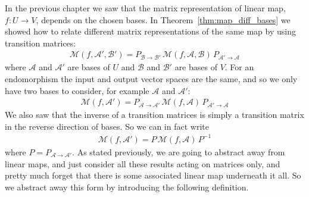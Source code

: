 In the previous chapter we saw that the matrix representation of linear map, $f:U\to V$, depends on the chosen bases. In Theorem~\ref{thm:map_diff_bases} we showed how to relate different matrix representations of the same map by using transition matrices:
\begin{align*}
\mathcal{M}(f,\mathcal{A}',\mathcal{B}') = P_{\mathcal{B}\to\mathcal{B}'} \, \mathcal{M}(f,\mathcal{A},\mathcal{B}) \, P_{\mathcal{A}'\to\mathcal{A}}
\end{align*}
where $\mathcal{A}$ and $\mathcal{A}'$ are bases of $U$ and $\mathcal{B}$ and $\mathcal{B}'$ are bases of $V$. For an endomorphism the input and output vector spaces are the same, and so we only have two bases to consider, for example $\mathcal{A}$ and $\mathcal{A}'$:
\begin{align*}
\mathcal{M}(f,\mathcal{A}') = P_{\mathcal{A}\to\mathcal{A}'} \, \mathcal{M}(f,\mathcal{A}) \, P_{\mathcal{A}'\to\mathcal{A}}
\end{align*}
We also saw that the inverse of a transition matrices is simply a transition matrix in the reverse direction of bases. So we can in fact write
\begin{align*}
\mathcal{M}(f,\mathcal{A}') = P \, \mathcal{M}(f,\mathcal{A}) \, P^{-1}
\end{align*}
where $P=P_{\mathcal{A}\to\mathcal{A}'}$. As stated previously, we are going to abstract away from linear maps, and just consider all these results acting on matrices only, and pretty much forget that there is some associated linear map underneath it all. So we abstract away this form by introducing the following definition.


